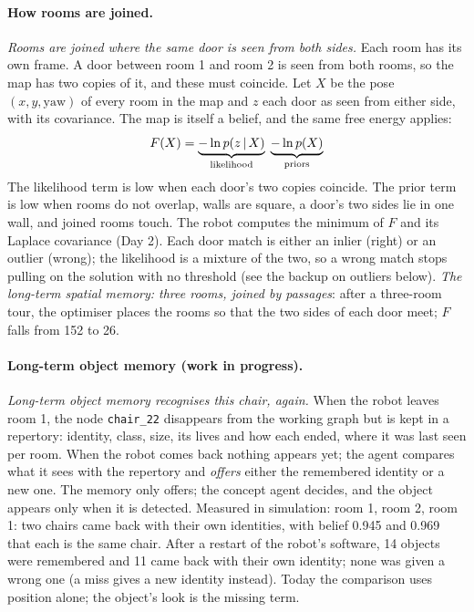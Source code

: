 \documentclass[11pt]{article}
\newcommand{\slt}[1]{\emph{#1}}   %
\begin{document}
\paragraph{How rooms are joined.} \slt{Rooms are joined where the same door is seen from both sides.} Each room has its own frame. A door between room 1 and room 2 is seen from both rooms, so the map has two copies of it, and these must coincide. Let $X$ be the pose $(x,y,\text{yaw})$ of every room in the map and $z$ each door as seen from either side, with its covariance. The map is itself a belief, and the same free energy applies:
\[
F(X) = \underbrace{-\ln p(z\,|\, X)}_{\text{likelihood}}\;\underbrace{-\ln p(X)}_{\text{priors}}
\]
The likelihood term is low when each door's two copies coincide. The prior term is low when rooms do not overlap, walls are square, a door's two sides lie in one wall, and joined rooms touch.
The robot computes the minimum of $F$ and its Laplace covariance (Day 2). Each door match is either an inlier (right) or an outlier (wrong); the likelihood is a mixture of the two, so a wrong match stops pulling on the solution with no threshold (see the backup on outliers below). \slt{The long-term spatial memory: three rooms, joined by passages}: after a three-room tour, the optimiser places the rooms so that the two sides of each door meet; $F$ falls from 152 to 26.

\paragraph{Long-term object memory (work in progress).} \slt{Long-term object memory recognises this chair, again.} When the robot leaves room 1, the node \texttt{chair\_22} disappears from the working graph but is kept in a repertory: identity, class, size, its lives and how each ended, where it was last seen per room. When the robot comes back nothing appears yet; the agent compares what it sees with the repertory and \emph{offers} either the remembered identity or a new one. The memory only offers; the concept agent decides, and the object appears only when it is detected. Measured in simulation: room 1, room 2, room 1: two chairs came back with their own identities, with belief 0.945 and 0.969 that each is the same chair. After a restart of the robot's software, 14 objects were remembered and 11 came back with their own identity; none was given a wrong one (a miss gives a new identity instead). Today the comparison uses position alone; the object's look is the missing term.
\end{document}
